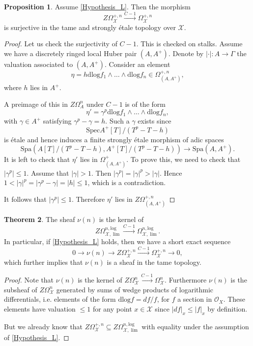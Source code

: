 \documentclass{amsart}
\def\Spa{\textrm{Spa}}
\def\Spec{\textrm{Spec}}
\theoremstyle{definition}
\newtheorem{theorem}{Theorem}[section]
\newtheorem{proposition}[theorem]{Proposition}
\newcommand\llog{\mathrm{log}}
\newcommand\dlog{\mathrm{dlog}}
\numberwithin{equation}{section}
\begin{document}
\begin{proposition}
	 Assume \cref{Hypothesis_L}. Then the morphism 
	\[
	Z\Omega^{+,n}_{\mathcal{X}}\xrightarrow{C-1} \Omega^{+,n}_{\mathcal{X}}
	\]
	is surjective in the tame and strongly \'etale topology over $\mathcal{X}$.
\end{proposition}
\begin{proof}
	Let us check the surjectivity of $C-1$. This is checked on stalks. Assume we have a discretely ringed local Huber pair $(A,A^+)$. Denote by $|\cdot|:A\to \Gamma$ the valuation associated to $(A,A^+)$. Consider an element
	 $$\eta= h \dlog f_1\wedge \dots \wedge  \dlog f_n \in \Omega_{(A,A^+)}^{+,n},$$
	 where $h$ lies in $A^+$.
	 
	 A preimage of this in $Z\Omega^n_A$ under $C-1$ is of the form 
	$$\eta'=\gamma^p \dlog f_1 \wedge \dots \wedge \dlog f_n,$$
	with $\gamma \in A^+$ satisfying $\gamma^p -\gamma = h$. Such a $\gamma$ exists since 
	$$\Spec A^+[T]/(T^p-T-h)$$
	is \'etale and hence induces a finite strongly \'etale morphism of adic spaces
	\[
	\Spa(A[T]/(T^p-T-h), A^+[T]/(T^p-T-h))\to \Spa(A,A^+).
	\] 
	It is left to check that $\eta'$ lies in $\Omega^+_{(A,A^+)}$. To prove this, we need to check that $|\gamma^p|\leq 1$. Assume that $|\gamma|>1$. Then $|\gamma^p|=|\gamma|^p>|\gamma|$. Hence $1<|\gamma|^p=|\gamma^p-\gamma|=|h|\leq 1$, which is a contradiction.
	
	It follows that $|\gamma^p|\leq 1$. Therefore $\eta'$ lies in $Z\Omega_{(A,A^+)}^{+,n}$
\end{proof}
\begin{theorem}\label{C-1Shortexact}
	The sheaf $\nu(n)$ is the kernel of 
	\[
	Z\Omega_{\mathcal{X},\lim}^{n,\llog}\xrightarrow{C-1}\Omega_{\mathcal{X},\lim}^{n,\llog}.
	\]
	In particular, if \cref{Hypothesis_L} holds, then we have a short exact sequence
	\[
		0\to\nu(n)\to Z\Omega^{+,n}_{\mathcal{X}}\xrightarrow{C-1} \Omega^{+,n}_{\mathcal{X}}\to 0,
	\]
	which further implies that $\nu(n)$ is a sheaf in the tame topology.
\end{theorem}
\begin{proof}
Note that $\nu(n)$ is the kernel of $Z\Omega_{\mathcal{X}}^n\xrightarrow{C-1}\Omega_{\mathcal{X}}^n$. Furthermore $\nu(n)$ is the subsheaf of $Z\Omega_{\mathcal{X}}^n$ generated by sums of wedge products of logarithmic differentials, i.e. elements of the form $\dlog f=df/f$, for $f$ a section in $\mathcal{O}_X$. These elements have valuation $\leq 1$ for any point $x\in \mathcal{X}$ since $|df|_x\leq |f|_x$ by definition.
	
	But we already know that $Z\Omega^{+,n}_{\mathcal{X}}\subseteq Z\Omega^{n,\llog}_{\mathcal{X},\lim}$ with equality under the assumption of \cref{Hypothesis_L}.
\end{proof}
\end{document}
